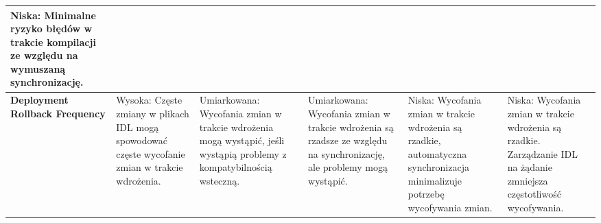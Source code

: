\documentclass[runningheads,12pt]{llncs}
\begin{document}
\begin{table}[htbp]
\begin{tabularx}{\textwidth}{|>{\raggedright\arraybackslash}X|>{\raggedright\arraybackslash}X|>{\raggedright\arraybackslash}X|>{\raggedright\arraybackslash}X|>{\raggedright\arraybackslash}X|>{\raggedright\arraybackslash}X|}
    Niska: Minimalne ryzyko błędów w trakcie kompilacji ze względu na wymuszaną synchronizację. \\
    \hline
    \textbf{Deployment Rollback Frequency} &
    Wysoka: Częste zmiany w plikach IDL mogą spowodować częste wycofanie zmian w trakcie wdrożenia. &
    Umiarkowana: Wycofania zmian w trakcie wdrożenia mogą wystąpić, jeśli wystąpią problemy z kompatybilnością wsteczną. &
    Umiarkowana: Wycofania zmian w trakcie wdrożenia są rzadsze ze względu na synchronizację, ale problemy mogą wystąpić. &
    Niska: Wycofania zmian w trakcie wdrożenia są rzadkie, automatyczna synchronizacja minimalizuje potrzebę wycofywania zmian. &
    Niska: Wycofania zmian w trakcie wdrożenia są rzadkie. Zarządzanie IDL na żądanie zmniejsza częstotliwość wycofywania. \\
    \hline
    \end{tabularx}
\end{table}

\newpage
\end{document}
